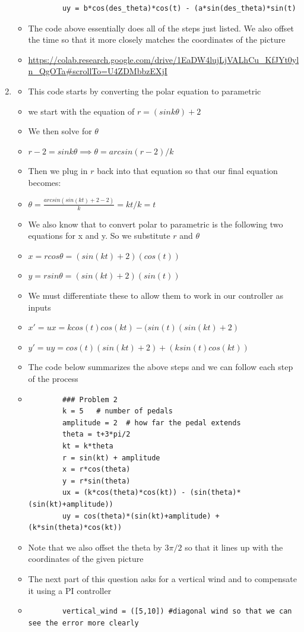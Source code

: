 \documentclass[10pt]{article}
\begin{document}
\begin{enumerate}
\begin{itemize}
\begin{lstlisting}
        uy = b*cos(des_theta)*cos(t) - (a*sin(des_theta)*sin(t) 
        \end{lstlisting}
        \item The code above essentially does all of the steps just listed. We also offset the time so that it more closely matches the coordinates of the picture
        \item \url{https://colab.research.google.com/drive/1EaDW4lujLjVALhCu_KfJYt0yln_QgOTa#scrollTo=U4ZDMbbzEXjI}
    \end{itemize}
    \item
    \begin{itemize}
        \item This code starts by converting the polar equation to parametric
        \item we start with the equation of $r=(sink\theta)+2$
        \item We then solve for $\theta$
        \item $r-2=sink\theta\implies\theta=arcsin(r-2)/k$
        \item Then we plug in $r$ back into that equation so that our final equation becomes:
        \item $\theta = \frac{arcsin(sin(kt)+2-2)}{k}=kt/k = t$
        \item We also know that to convert polar to parametric is the following two equations for x and y. So we substitute $r$ and $\theta$
        \item $x=rcos\theta = (sin(kt)+2)(cos(t))$
        \item $y=rsin\theta = (sin(kt)+2)(sin(t))$
        \item We must differentiate these to allow them to work in our controller as inputs
        \item $x'=ux=kcos(t)cos(kt) - (sin(t)(sin(kt)+2)$
        \item $y'=uy=cos(t)(sin(kt)+2)+(ksin(t)cos(kt))$
        \item The code below summarizes the above steps and we can follow each step of the process
        \item \begin{lstlisting}
        ### Problem 2
        k = 5   # number of pedals
        amplitude = 2  # how far the pedal extends
        theta = t+3*pi/2
        kt = k*theta
        r = sin(kt) + amplitude
        x = r*cos(theta)
        y = r*sin(theta)
        ux = (k*cos(theta)*cos(kt)) - (sin(theta)*(sin(kt)+amplitude))
        uy = cos(theta)*(sin(kt)+amplitude) + (k*sin(theta)*cos(kt))
        \end{lstlisting}
        \item Note that we also offset the theta by $3\pi/2$ so that it lines up with the coordinates of the given picture
        \item The next part of this question asks for a vertical wind and to compensate it using a PI controller
        \item \begin{lstlisting}
        vertical_wind = ([5,10]) #diagonal wind so that we can see the error more clearly


\end{lstlisting}
\end{itemize}
\end{enumerate}
\end{document}

